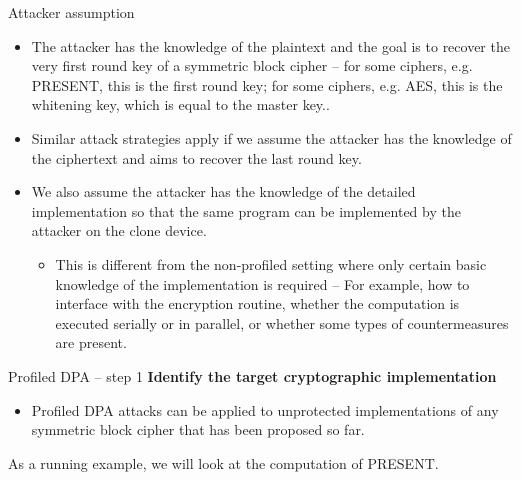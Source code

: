 \begin{frame}{Attacker assumption}
    \begin{itemize}
        \item The attacker has the knowledge of the plaintext and the goal is to recover the very first round key of a symmetric block cipher -- for some
ciphers, e.g. PRESENT, this is the first round key; for some ciphers, e.g. AES, this is the whitening key, which is equal to the master key..
        \item Similar attack strategies apply if we assume the attacker has the knowledge of the ciphertext and aims to recover the last round key.
        \item We also assume the attacker has the knowledge of the detailed implementation so that the same program can be implemented by the attacker on the clone device.
        \begin{itemize}
            \item This is different from the non-profiled setting where only certain basic knowledge of the implementation is required -- For example, how to interface with the encryption routine, whether the computation is executed serially or in parallel, or whether some types of countermeasures are present.
        \end{itemize}
    \end{itemize}
\end{frame}

\begin{frame}{Profiled DPA -- step 1}
\textbf{Identify the target cryptographic implementation}
    \begin{itemize}
        \item Profiled DPA attacks can be applied to unprotected implementations of any symmetric block cipher that has been proposed so far.
    \end{itemize}
    \begin{example}
        As a running example, we will look at the computation of PRESENT.
    \end{example}
\end{frame}

